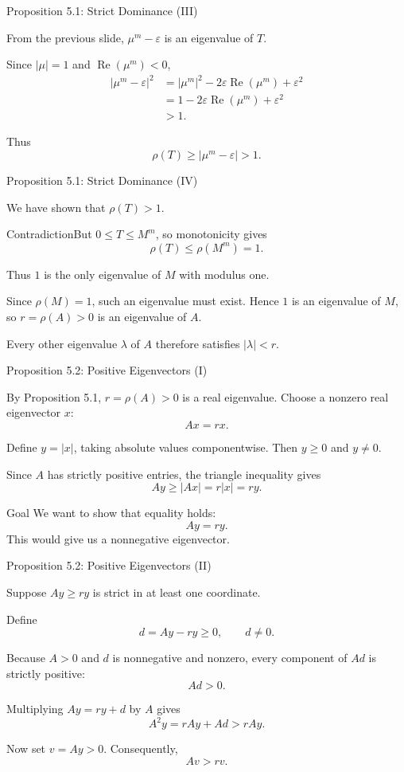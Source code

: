 \begin{frame}{Proposition 5.1: Strict Dominance (III)}
\small

From the previous slide,
$\mu^m-\varepsilon$ is an eigenvalue of $T$.

Since $|\mu|=1$ and
$\operatorname{Re}(\mu^m)<0$,
\[
\begin{aligned}
|\mu^m-\varepsilon|^2
&=|\mu^m|^2
  -2\varepsilon\operatorname{Re}(\mu^m)
  +\varepsilon^2\\
&=1-2\varepsilon\operatorname{Re}(\mu^m)
  +\varepsilon^2\\
&>1.
\end{aligned}
\]

Thus
\[
\rho(T)\geq|\mu^m-\varepsilon|>1.
\]
\end{frame}

\begin{frame}{Proposition 5.1: Strict Dominance (IV)}
\small

We have shown that $\rho(T)>1$.

\begin{block}{Contradiction}But $0\leq T\leq M^m$, so monotonicity gives
\[
\rho(T)\leq\rho(M^m)=1.
\]
\end{block}


Thus $1$ is the only eigenvalue of $M$
with modulus one.

Since $\rho(M)=1$, such an eigenvalue
must exist. Hence $1$ is an eigenvalue
of $M$, so $r=\rho(A)>0$ is an eigenvalue
of $A$.

Every other eigenvalue $\lambda$ of $A$
therefore satisfies $|\lambda|<r$.
\end{frame}

\begin{frame}{Proposition 5.2: Positive Eigenvectors (I)}
\small

By Proposition 5.1, $r=\rho(A)>0$ is a real
eigenvalue. Choose a nonzero real eigenvector $x$:
\[
Ax=rx.
\]

Define $y=|x|$, taking absolute values
componentwise. Then $y\geq 0$ and $y\neq 0$.

Since $A$ has strictly positive entries,
the triangle inequality gives
\[
Ay\geq |Ax|=r|x|=ry.
\]

\begin{block}{Goal}
We want to show that equality holds:
\[
Ay=ry.
\]
This would give us a nonnegative eigenvector.
\end{block}
\end{frame}

\begin{frame}{Proposition 5.2: Positive Eigenvectors (II)}
\small

Suppose $Ay\geq ry$ is strict in at least
one coordinate.

Define
\[
d=Ay-ry\geq0,\qquad d\neq0.
\]

Because $A>0$ and $d$ is nonnegative
and nonzero, every component of $Ad$
is strictly positive:
\[
Ad>0.
\]

Multiplying $Ay=ry+d$ by $A$ gives
\[
A^2y=rAy+Ad>rAy.
\]

Now set $v=Ay>0$. Consequently,
\[
\boxed{Av>rv.}
\]
\end{frame}

